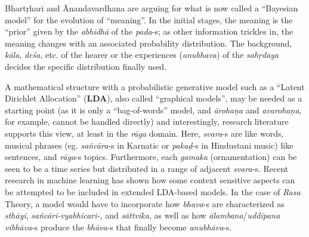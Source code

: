 Bhartṛhari and Ānandavardhana are arguing for what is now called a “Bayesian model” for the evolution of “meaning”. In the initial stages, the meaning is the “prior” given by the \textsl{abhidhā} of the \textsl{pada}-s; as other information trickles in, the meaning changes with an associated probability distribution. The background, \textsl{kāla}, \textsl{deśa}, etc. of the hearer or the experiences (\textsl{anubhava}) of the \textsl{sahṛdaya} decides the specific distribution finally used. 

A mathematical structure with a probabilistic generative model such as a “Latent Dirichlet Allocation” (\textbf{LDA}), also called “graphical models”, may be needed as a starting point (as it is only a “bag-of-words” model, and \textsl{ārohaṇa} and \textsl{avarohaṇa}, for example, cannot be handled directly) and interestingly, research literature supports this view, at least in the \textsl{rāga} domain. Here, \textsl{svara}-s are like words, musical phrases (eg. \textsl{sañcāra}-s in Karnatic or \textsl{pakaḍ}-s in Hindustani music) like sentences, and \textsl{rāga}-s topics. Furthermore, each \textsl{gamaka} (ornamentation) can be seen to be a time series but distributed in a range of adjacent \hbox{\textsl{svara}-s}. Recent research in machine learning has shown how some context sensitive aspects can be attempted to be included in extended LDA-based models. In the case of \textsl{Rasa} Theory, a model would have to incorporate how \textsl{bhava}-s are characterized as \textsl{sthāyi}, \textsl{sañcāri-vyabhicari-}, and \textsl{sāttvika}, as well as how \textsl{ālambana}/\textsl{uddīpana vibhāva}-s produce the \textsl{bhāva}-s that finally become \textsl{anubhāva}-s.

